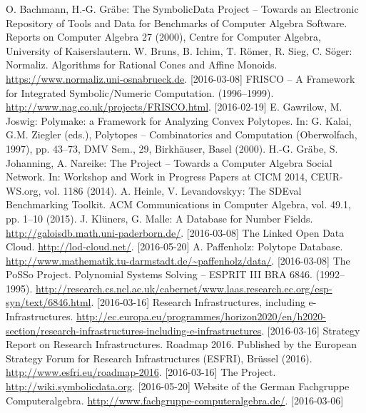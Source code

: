 \documentclass[11pt]{article}
\begin{document}
\raggedright
\begin{thebibliography}{00}
\setlength{\itemsep}{-1mm}
\footnotesize
{} O. Bachmann, H.-G. Gr\"abe: The SymbolicData Project --
  Towards an Electronic Repository of Tools and Data for Benchmarks of Computer
  Algebra Software. Reports on Computer Algebra 27 (2000), Centre for Computer
  Algebra, University of Kaiserslautern.
 W. Bruns, B. Ichim, T. R\"omer, R. Sieg, C. S\"oger:
  Normaliz.  Algorithms for Rational Cones and Affine Monoids.
  \url{https://www.normaliz.uni-osnabrueck.de}. [2016-03-08]
 FRISCO -- A Framework for Integrated Symbolic/Numeric
  Computation. (1996--1999).  \url{http://www.nag.co.uk/projects/FRISCO.html}.
  [2016-02-19]
 E. Gawrilow, M. Joswig: Polymake: a Framework for Analyzing
  Convex Polytopes. In: G. Kalai, G.M. Ziegler (eds.), Polytopes --
  Combinatorics and Computation (Oberwolfach, 1997), pp. 43--73, DMV Sem., 29,
  Birkh\"auser, Basel (2000).
 H.-G. Gr\"abe, S. Johanning, A. Nareike: The {\SD} Project --
  Towards a Computer Algebra Social Network. In: Workshop and Work in Progress
  Papers at CICM 2014, CEUR-WS.org, vol. 1186 (2014).
 A. Heinle, V. Levandovskyy: The SDEval Benchmarking
  Toolkit. ACM Communications in Computer Algebra, vol. 49.1, pp. 1--10 (2015).
 J. Kl\"uners, G. Malle: A Database for Number Fields.
  \url{http://galoisdb.math.uni-paderborn.de/}. [2016-03-08]
 The Linked Open Data Cloud.  \url{http://lod-cloud.net/}.
  [2016-05-20]
 A. Paffenholz: Polytope Database.
  \url{http://www.mathematik.tu-darmstadt.de/~paffenholz/data/}.  [2016-03-08]
 The PoSSo Project. Polynomial Systems Solving -- ESPRIT III BRA
  6846.  (1992--1995).
  \url{http://research.cs.ncl.ac.uk/cabernet/www.laas.research.ec.org/esp-syn/text/6846.html}. 
      [2016-03-16]
 Research Infrastructures, including e-Infrastructures.
  \url{http://ec.europa.eu/programmes/horizon2020/en/h2020-section/research-infrastructures-including-e-infrastructures}. [2016-03-16]
 Strategy Report on Research Infrastructures.  Roadmap 2016.
  Published by the European Strategy Forum for Research Infrastructures
  (ESFRI), Br\"ussel (2016).  \url{http://www.esfri.eu/roadmap-2016}.
  [2016-03-16]
 The {\SD} Project.  \url{http://wiki.symbolicdata.org}.
  [2016-05-20]
 Website of the German Fachgruppe Computeralgebra.   
  \url{http://www.fachgruppe-computeralgebra.de/}. [2016-03-06]
\end{thebibliography}
\end{document}
